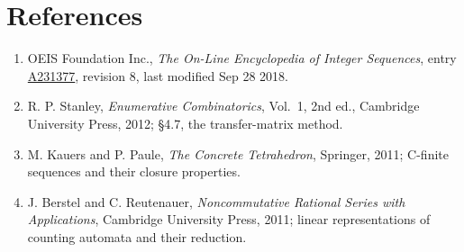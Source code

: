 \documentclass[11pt]{article}
\theoremstyle{definition}
\begin{document}
\section{References}

\begin{enumerate}

\item OEIS Foundation Inc., \emph{The On-Line Encyclopedia of Integer Sequences}, entry \href{https://oeis.org/A231377}{A231377}, revision 8, last modified Sep 28 2018.

\item R. P. Stanley, \emph{Enumerative Combinatorics}, Vol.~1, 2nd ed., Cambridge University Press, 2012; \S4.7, the transfer-matrix method.

\item M. Kauers and P. Paule, \emph{The Concrete Tetrahedron}, Springer, 2011; C-finite sequences and their closure properties.

\item J. Berstel and C. Reutenauer, \emph{Noncommutative Rational Series with Applications}, Cambridge University Press, 2011; linear representations of counting automata and their reduction.

\end{enumerate}
\end{document}
